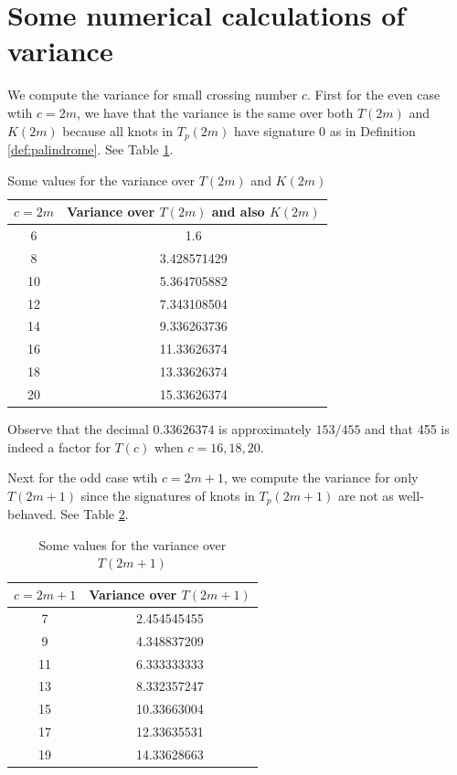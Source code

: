\documentclass[11pt]{amsart}
\theoremstyle{definition}
\theoremstyle{remark}
\numberwithin{equation}{section}
\begin{document}
\section{Some numerical calculations of variance}

We compute the variance for small crossing number $c$.  First for the even case wtih $c=2m$, we have that the variance is the same over both $T(2m)$ and $K(2m)$ because all knots in $T_p(2m)$ have signature 0 as in Definition \ref{def:palindrome}.  See Table \ref{tab:vareven}.

\begin{table}[!h]
\begin{tabular}{c|c}
$c=2m$ & Variance over $T(2m)$ and also $K(2m)$\\
\hline
6	& 1.6         \\
8	& 3.428571429 \\
10	& 5.364705882 \\
12	& 7.343108504 \\
14	& 9.336263736 \\
16	& 11.33626374 \\
18	& 13.33626374 \\
20	& 15.33626374
\end{tabular}
\caption{\label{tab:vareven} Some values for the variance over $T(2m)$ and $K(2m)$}
\end{table}

Observe that the decimal $0.33626374$ is approximately $153/455$ and that 455 is indeed a factor for $T(c)$ when $c=16,18,20$.

Next for the odd case wtih $c=2m+1$, we compute the variance for  only $T(2m+1)$  since the signatures of knots in $T_p(2m+1)$ are not as well-behaved.  See Table \ref{tab:varodd}.

\begin{table}[!h]
\begin{tabular}{c|c}
$c=2m+1$ & Variance over $T(2m+1)$\\
\hline
7	&	2.454545455 \\
9	&	4.348837209 \\
11	&	6.333333333 \\
13	&	8.332357247 \\
15	&	10.33663004 \\
17	&	12.33635531 \\
19	&	14.33628663
\end{tabular}
\caption{\label{tab:varodd} Some values for the variance over $T(2m+1)$}
\end{table}
\end{document}
